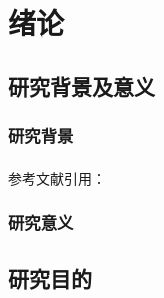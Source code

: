 \documentclass[cs4size,a4paper]{ctexart}
\numberwithin{equation}{section}
\numberwithin{table}{section}
\numberwithin{figure}{section}
\newcommand{\upcite}[1]{\textsuperscript{\textsuperscript{\cite{#1}}}}%
\begin{document}
\renewcommand{\contentsname}{\hspace*{\fill}目\quad 录\hspace*{\fill}}
\renewcommand{\abstractname}{摘要}
\renewcommand{\refname}{参考文献}
\renewcommand{\indexname}{索引}
\renewcommand\thefigure{\thesection-\arabic{figure}}
\renewcommand{\figurename}{图}
\renewcommand\thetable{\thesection-\arabic{table}}
\renewcommand{\tablename}{表}
\renewcommand{\appendixname}{附录}
\renewcommand{\proofname}{证明}
\renewcommand{\algorithm}{算法}

%
\pagestyle{plain}          %


\renewcommand{\cftdot}{.}

\tableofcontents
\newpage

\pagestyle{plain}



\section{绪论}

\subsection{研究背景及意义}

\subsubsection{研究背景}


参考文献引用：~\upcite{huang2008stock}


\subsubsection{研究意义}



\subsection{研究目的}
\end{document}
